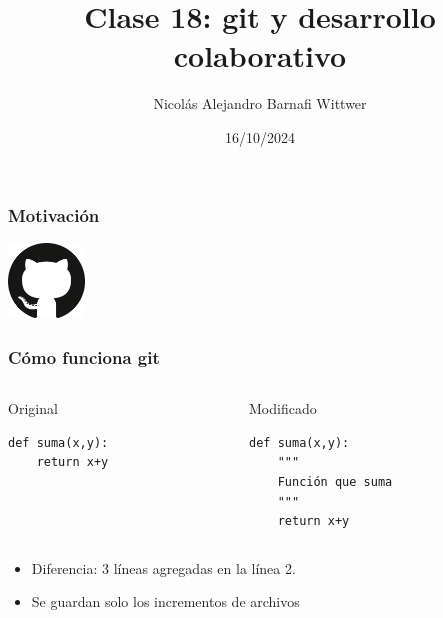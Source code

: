 \documentclass[14pt,aspectratio=169,xcolor=dvipsnames]{beamer}
\title[short title]{Clase 18: git y desarrollo colaborativo}
\subtitle{}
\author[NA Barnafi] {Nicolás Alejandro Barnafi Wittwer}
\institute[UC|CMM] 
{
    Pontificia Universidad Católica de Chile \\
    Centro de Modelamiento Matemático
}
\date{16/10/2024}
\begin{document}
\begin{frame}
    \maketitle
\end{frame}
\begin{frame}\frametitle{Motivación}
    {\huge
    \begin{center}
    \end{center}
    }
    \begin{flushright}
    \includegraphics[height=2cm]{../images/logos/git.png}
    \end{flushright}
\end{frame}
\begin{frame}[t,fragile]\frametitle{Cómo funciona git}
  \begin{columns}
    \begin{column}[t]{0.45\textwidth}
        Original
        \begin{verbatim}
def suma(x,y):
    return x+y
        \end{verbatim}
    \end{column}
    \begin{column}[t]{0.45\textwidth}
        Modificado
        \begin{verbatim}
def suma(x,y):
    """
    Función que suma
    """
    return x+y
        \end{verbatim}
    \end{column}
  \end{columns}

  \vspace{1cm}
  \begin{itemize}
  \item Diferencia: 3 líneas agregadas en la línea 2. 

  \item Se guardan solo los \alert{incrementos} de archivos
  \end{itemize}
\end{frame}
\end{document}
